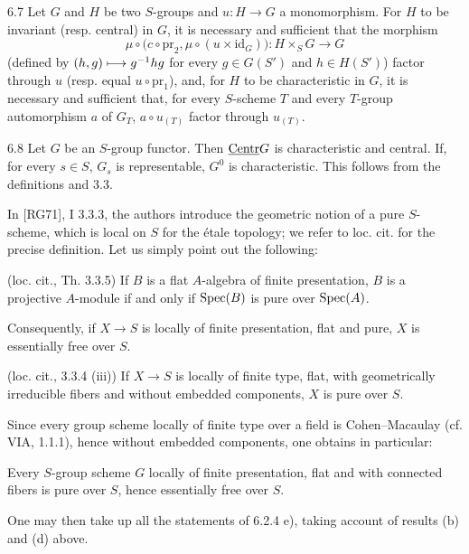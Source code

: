\begin{remark}{6.7}\label{VIB.6.7}
Let $G$ and $H$ be two $S$-groups and $u:H\to G$ a monomorphism. For $H$ to be invariant (resp. central) in $G$, it is necessary and sufficient that the morphism
\[
\mu\circ\bigl(c\circ\mathrm{pr}_2,\mu\circ(u\times\mathrm{id}_G)\bigr):H\times_SG\longrightarrow G
\]
(defined by $(h,g)\longmapsto g^{-1}hg$ for every $g\in G(S')$ and $h\in H(S')$) factor through $u$ (resp. equal $u\circ\mathrm{pr}_1$), and, for $H$ to be characteristic in $G$, it is necessary and sufficient that, for every $S$-scheme $T$ and every $T$-group automorphism $a$ of $G_T$, $a\circ u_{(T)}$ factor through $u_{(T)}$.
\end{remark}
\begin{example}{6.8}\label{VIB.6.8}
Let $G$ be an $S$-group functor. Then $\underline{\mathrm{Centr}} G$ is characteristic and central. If, for every $s\in S$, $G_s$ is representable, $G^0$ is characteristic. This follows from the definitions and 3.3.
\end{example}
In [RG71], I 3.3.3, the authors introduce the geometric notion of a pure $S$-scheme, which is local on $S$ for the étale topology; we refer to loc. cit. for the precise definition. Let us simply point out the following:
\begin{enumeratea}
\item (loc. cit., Th. 3.3.5) If $B$ is a flat $A$-algebra of finite presentation, $B$ is a projective $A$-module if and only if $\operatorname{Spec}(B)$ is pure over $\operatorname{Spec}(A)$.
\item Consequently, if $X\to S$ is locally of finite presentation, flat and pure, $X$ is essentially free over $S$.
\item (loc. cit., 3.3.4 (iii)) If $X\to S$ is locally of finite type, flat, with geometrically irreducible fibers and without embedded components, $X$ is pure over $S$.
\end{enumeratea}
Since every group scheme locally of finite type over a field is Cohen--Macaulay (cf. VIA, 1.1.1), hence without embedded components, one obtains in particular:
\begin{enumeratea}\setcounter{enumi}{3}
\item Every $S$-group scheme $G$ locally of finite presentation, flat and with connected fibers is pure over $S$, hence essentially free over $S$.
\end{enumeratea}
One may then take up all the statements of 6.2.4 e), taking account of results (b) and (d) above.

